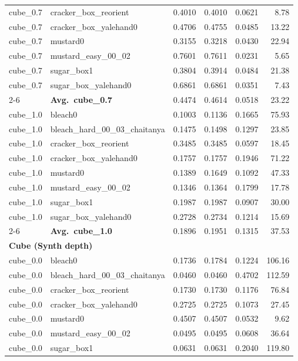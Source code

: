 \begin{longtable}{llrrrr}
  cube_0.7 & cracker\_box\_reorient & 0.4010 & 0.4010 & 0.0621 & 8.78 \\
  cube_0.7 & cracker\_box\_yalehand0 & 0.4706 & 0.4755 & 0.0485 & 13.22 \\
  cube_0.7 & mustard0 & 0.3155 & 0.3218 & 0.0430 & 22.94 \\
  cube_0.7 & mustard\_easy\_00\_02 & 0.7601 & 0.7611 & 0.0231 & 5.65 \\
  cube_0.7 & sugar\_box1 & 0.3804 & 0.3914 & 0.0484 & 21.38 \\
  cube_0.7 & sugar\_box\_yalehand0 & 0.6861 & 0.6861 & 0.0351 & 7.43 \\
  \cmidrule{2-6}
  & \textbf{Avg.~cube_0.7} & 0.4474 & 0.4614 & 0.0518 & 23.22 \\
  \midrule
  cube_1.0 & bleach0 & 0.1003 & 0.1136 & 0.1665 & 75.93 \\
  cube_1.0 & bleach\_hard\_00\_03\_chaitanya & 0.1475 & 0.1498 & 0.1297 & 23.85 \\
  cube_1.0 & cracker\_box\_reorient & 0.3485 & 0.3485 & 0.0597 & 18.45 \\
  cube_1.0 & cracker\_box\_yalehand0 & 0.1757 & 0.1757 & 0.1946 & 71.22 \\
  cube_1.0 & mustard0 & 0.1389 & 0.1649 & 0.1092 & 47.33 \\
  cube_1.0 & mustard\_easy\_00\_02 & 0.1346 & 0.1364 & 0.1799 & 17.78 \\
  cube_1.0 & sugar\_box1 & 0.1987 & 0.1987 & 0.0907 & 30.00 \\
  cube_1.0 & sugar\_box\_yalehand0 & 0.2728 & 0.2734 & 0.1214 & 15.69 \\
  \cmidrule{2-6}
  & \textbf{Avg.~cube_1.0} & 0.1896 & 0.1951 & 0.1315 & 37.53 \\
  \midrule
\multicolumn{6}{l}{\textbf{Cube (Synth depth)}} \\
\midrule
  cube_0.0 & bleach0 & 0.1736 & 0.1784 & 0.1224 & 106.16 \\
  cube_0.0 & bleach\_hard\_00\_03\_chaitanya & 0.0460 & 0.0460 & 0.4702 & 112.59 \\
  cube_0.0 & cracker\_box\_reorient & 0.1730 & 0.1730 & 0.1176 & 76.84 \\
  cube_0.0 & cracker\_box\_yalehand0 & 0.2725 & 0.2725 & 0.1073 & 27.45 \\
  cube_0.0 & mustard0 & 0.4507 & 0.4507 & 0.0532 & 9.62 \\
  cube_0.0 & mustard\_easy\_00\_02 & 0.0495 & 0.0495 & 0.0608 & 36.64 \\
  cube_0.0 & sugar\_box1 & 0.0631 & 0.0631 & 0.2040 & 119.80 \\

\end{longtable}
